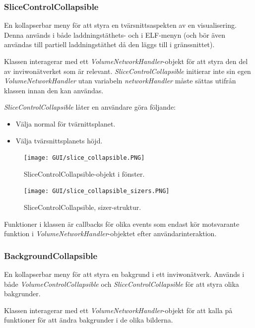 \subsubsection{SliceControlCollapsible}
En kollapserbar meny för att styra en tvärsnittsaspekten av en visualisering. Denna används i både laddningstäthets- och i ELF-menyn (och bör även användas till partiell laddningstäthet då den läggs till i gränssnittet).

Klassen interagerar med ett \textit{VolumeNetworkHandler}-objekt för att styra den del av inviwonätverket som är relevant. \textit{SliceControlCollapsible} initierar inte sin egen \textit{VolumeNetworkHandler} utan variabeln \textit{networkHandler} måste sättas utifrån klassen innan den kan användas.

\textit{SliceControlCollapsible} låter en användare göra följande:
\begin{itemize}
    \setlength\itemsep{0em}
    \item Välja normal för tvärnittsplanet.
    \item Välja tvärsnittsplanets höjd.
\end{itemize}

\begin{figure}[H]
  \centering
  \begin{minipage}[b]{0.4\textwidth}
    \texttt{[image: GUI/slice\_collapsible.PNG]}
    \caption{SliceControlCollapsible-objekt i fönster.}
  \end{minipage}
  \hfill
  \begin{minipage}[b]{0.4\textwidth}
    \texttt{[image: GUI/slice\_collapsible\_sizers.PNG]}
    \caption{SliceControlCollapsible, sizer-struktur.}
  \end{minipage}
\end{figure}

Funktioner i klassen är callbacks för olika events som endast kör motsvarante funktion i  \textit{VolumeNetworkHandler}-objektet efter användarinteraktion.

\subsubsection{BackgroundCollapsible}
En kollapserbar meny för att styra en bakgrund i ett inviwonätverk. Används i både \textit{VolumeControlCollapsible} och \textit{SliceControlCollapsible} för att styra olika bakgrunder.

Klassen interagerar med ett \textit{VolumeNetworkHandler}-objekt för att kalla på funktioner för att ändra bakgrunder i de olika bilderna.

